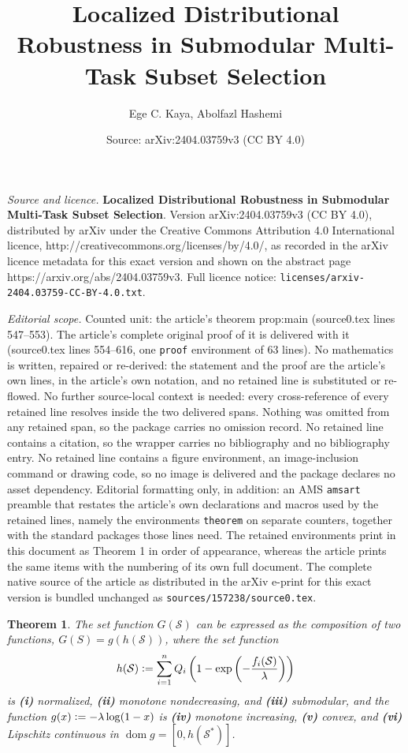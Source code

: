 \documentclass[10pt,a4paper]{amsart}
\title{\textbf{Localized Distributional Robustness in Submodular Multi-Task Subset Selection}}
\author{Ege C. Kaya, Abolfazl Hashemi}
\date{Source: arXiv:2404.03759v3 (CC BY 4.0)}
\newtheorem{theorem}{Theorem}
\def\lp{\left(}
\def\rp{\right)}
\def\sS{\mathcal{S}}
\begin{document}
\maketitle

\noindent\emph{Source and licence.} \textbf{Localized Distributional Robustness in Submodular Multi-Task Subset Selection}. Version arXiv:2404.03759v3 (CC BY 4.0), distributed by arXiv under the Creative Commons Attribution 4.0 International licence, http://creativecommons.org/licenses/by/4.0/, as recorded in the arXiv licence metadata for this exact version and shown on the abstract page https://arxiv.org/abs/2404.03759v3. Full licence notice: \texttt{licenses/arxiv-2404.03759-CC-BY-4.0.txt}.\par\smallskip

\noindent\textit{Editorial scope.} Counted unit: the article's theorem prop:main (source0.tex lines 547--553). The article's complete original proof of it is delivered with it (source0.tex lines 554--616, one \texttt{proof} environment of 63 lines). No mathematics is written, repaired or re-derived: the statement and the proof are the article's own lines, in the article's own notation, and no retained line is substituted or re-flowed.  No further source-local context is needed: every cross-reference of every retained line resolves inside the two delivered spans.  Nothing was omitted from any retained span, so the package carries no omission record.  No retained line contains a citation, so the wrapper carries no bibliography and no bibliography entry.  No retained line contains a figure environment, an image-inclusion command or drawing code, so no image is delivered and the package declares no asset dependency.  Editorial formatting only, in addition: an AMS \texttt{amsart} preamble that restates the article's own declarations and macros used by the retained lines, namely the environments \texttt{theorem} on separate counters, together with the standard packages those lines need.  The retained environments print in this document as Theorem 1 in order of appearance, whereas the article prints the same items with the numbering of its own full document.  The complete native source of the article as distributed in the arXiv e-print for this exact version is bundled unchanged as \texttt{sources/157238/source0.tex}.
\begin{theorem}\label{prop:main}
The set function $G(\sS)$ can be expressed as the composition of two functions, $G(S) = g(h(\sS))$, where the set function
\begin{equation}
h(\sS) \vcentcolon= \sum_{i=1}^n Q_i \lp1-\exp\lp-\frac{f_i(\sS)}{\lambda}\rp\rp
\end{equation}
is \textbf{(i)} normalized, \textbf{(ii)} monotone nondecreasing, and \textbf{(iii)} submodular, and the function $g(x) \vcentcolon= -\lambda\log(1-x)$ is \textbf{(iv)} monotone increasing, \textbf{(v)} convex, and \textbf{(vi)} Lipschitz continuous in $\operatorname{dom}g = [0, h(\sS^\ast)]$.
\end{theorem}
\end{document}
